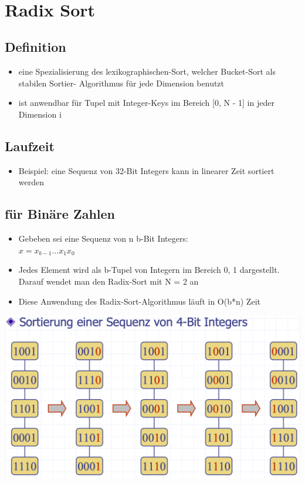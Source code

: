 \vfill
$ $
\columnbreak


\section{Radix Sort}
\subsection{Definition}
\begin{itemize}
    \item eine Spezialisierung des lexikographischen-Sort, welcher Bucket-Sort als stabilen Sortier- Algorithmus für jede Dimension benutzt
    \item ist anwendbar für Tupel mit Integer-Keys im Bereich [0, N - 1] in jeder Dimension i
\end{itemize}

\subsection{Laufzeit}
\begin{itemize}
    \item Beispiel: eine Sequenz von 32-Bit Integers kann in linearer Zeit sortiert werden
\end{itemize}

\subsection{für Binäre Zahlen}
\begin{itemize}
    \item Gebeben sei eine Sequenz von n b-Bit Integers:\\
    $x = x_{b - 1} ... x_1x_0$
    \item Jedes Element wird als b-Tupel von Integern im Bereich {0, 1} dargestellt. Darauf wendet man den Radix-Sort mit N = 2 an
    \item Diese Anwendung des Radix-Sort-Algorithmus läuft in O(b*n) Zeit
\end{itemize}


\vspace{-8pt}
\begin{center}
    \includegraphics[scale=.2]{graphic/07 RadixSort/radix.png}
\end{center}
\vspace{-8pt}




\newpage